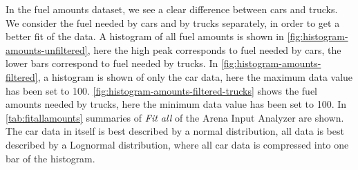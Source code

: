 In the fuel amounts dataset, we see a clear difference between cars and trucks.
We consider the fuel needed by cars and by trucks separately, in order to get a better fit of the data.
A histogram of all fuel amounts is shown in \autoref{fig:histogram-amounts-unfiltered}, here the high peak corresponds to fuel needed by cars, the lower bars correspond to fuel needed by trucks.
In \autoref{fig:histogram-amounts-filtered}, a histogram is shown of only the car data, here the maximum data value has been set to 100.
\autoref{fig:histogram-amounts-filtered-trucks} shows the fuel amounts needed by trucks, here the minimum data value has been set to 100.
In \autoref{tab:fitallamounts} summaries of \textit{Fit all} of the Arena Input Analyzer are shown.
The car data in itself is best described by a normal distribution, all data is best described by a Lognormal distribution, where all car data is compressed into one bar of the histogram.





